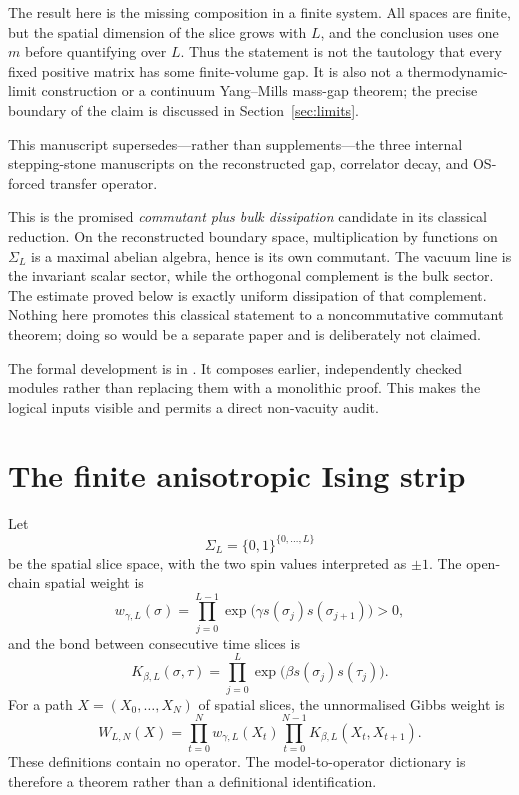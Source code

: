 \documentclass[11pt]{article}
\begin{document}
The result here is the missing composition in a finite system.  All spaces are
finite, but the spatial dimension of the slice grows with $L$, and the
conclusion uses one $m$ before quantifying over $L$.  Thus the statement is not
the tautology that every fixed positive matrix has some finite-volume gap.
It is also not a thermodynamic-limit construction or a continuum Yang--Mills
mass-gap theorem; the precise boundary of the claim is discussed in
Section~\ref{sec:limits}.

This manuscript supersedes---rather than supplements---the three internal
stepping-stone manuscripts on the reconstructed gap, correlator decay, and
OS-forced transfer operator.

This is the promised \emph{commutant plus bulk dissipation} candidate in its
classical reduction.  On the reconstructed boundary space, multiplication by
functions on $\Sigma_L$ is a maximal abelian algebra, hence is its own
commutant.  The vacuum line is the invariant scalar sector, while the
orthogonal complement is the bulk sector.  The estimate proved below is
exactly uniform dissipation of that complement.  Nothing here promotes this
classical statement to a noncommutative commutant theorem; doing so would be a
separate paper and is deliberately not claimed.

The formal development is in
. It composes earlier,
independently checked modules rather than replacing them with a monolithic
proof.  This makes the logical inputs visible and permits a direct
non-vacuity audit.

\section{The finite anisotropic Ising strip}

Let
\[
  \Sigma_L=\{0,1\}^{\{0,\ldots,L\}}
\]
be the spatial slice space, with the two spin values interpreted as $\pm1$.
The open-chain spatial weight is
\[
  w_{\gamma,L}(\sigma)
   =\prod_{j=0}^{L-1}\exp\!\bigl(\gamma s(\sigma_j)s(\sigma_{j+1})\bigr)>0,
\]
and the bond between consecutive time slices is
\[
  K_{\beta,L}(\sigma,\tau)
   =\prod_{j=0}^{L}\exp\!\bigl(\beta s(\sigma_j)s(\tau_j)\bigr).
\]
For a path $X=(X_0,\ldots,X_N)$ of spatial slices, the unnormalised Gibbs
weight is
\[
 W_{L,N}(X)=\prod_{t=0}^{N}w_{\gamma,L}(X_t)
             \prod_{t=0}^{N-1}K_{\beta,L}(X_t,X_{t+1}).
\]
These definitions contain no operator.  The model-to-operator dictionary is
therefore a theorem rather than a definitional identification.
\end{document}

